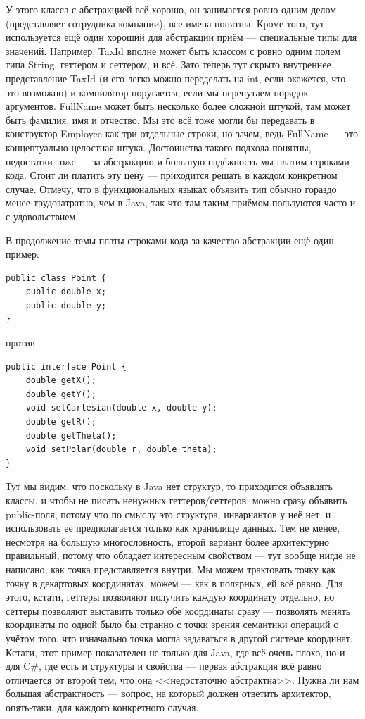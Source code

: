 \documentclass[a5paper]{article}
\begin{document}
У этого класса с абстракцией всё хорошо, он занимается ровно одним делом (представляет сотрудника компании), все имена понятны. Кроме того, тут используется ещё один хороший для абстракции приём --- специальные типы для значений. Например, TaxId вполне может быть классом с ровно одним полем типа String, геттером и сеттером, и всё. Зато теперь тут скрыто внутреннее представление TaxId (и его легко можно переделать на int, если окажется, что это возможно) и компилятор поругается, если мы перепутаем порядок аргументов. FullName может быть несколько более сложной штукой, там может быть фамилия, имя и отчество. Мы это всё тоже могли бы передавать в конструктор Employee как три отдельные строки, но зачем, ведь FullName --- это концептуально целостная штука. Достоинства такого подхода понятны, недостатки тоже --- за абстракцию и большую надёжность мы платим строками кода. Стоит ли платить эту цену --- приходится решать в каждом конкретном случае. Отмечу, что в функциональных языках объявить тип обычно гораздо менее трудозатратно, чем в Java, так что там таким приёмом пользуются часто и с удовольствием.

В продолжение темы платы строками кода за качество абстракции ещё один пример:

\begin{verbatim}
public class Point {
    public double x;
    public double y;
}
\end{verbatim}

против

\begin{verbatim}
public interface Point {
    double getX();
    double getY();
    void setCartesian(double x, double y);
    double getR();
    double getTheta();
    void setPolar(double r, double theta);
}
\end{verbatim}

Тут мы видим, что поскольку в Java нет структур, то приходится объявлять классы, и чтобы не писать ненужных геттеров/сеттеров, можно сразу объявить public-поля, потому что по смыслу это структура, инвариантов у неё нет, и использовать её предполагается только как хранилище данных. Тем не менее, несмотря на большую многословность, второй вариант более архитектурно правильный, потому что обладает интересным свойством --- тут вообще нигде не написано, как точка представляется внутри. Мы можем трактовать точку как точку в декартовых координатах, можем --- как в полярных, ей всё равно. Для этого, кстати, геттеры позволяют получить каждую координату отдельно, но сеттеры позволяют выставить только обе координаты сразу --- позволять менять координаты по одной было бы странно с точки зрения семантики операций с учётом того, что изначально точка могла задаваться в другой системе координат. Кстати, этот пример показателен не только для Java, где всё очень плохо, но и для C\#, где есть и структуры и свойства --- первая абстракция всё равно отличается от второй тем, что она <<недостаточно абстрактна>>. Нужна ли нам большая абстрактность --- вопрос, на который должен ответить архитектор, опять-таки, для каждого конкретного случая.
\end{document}
